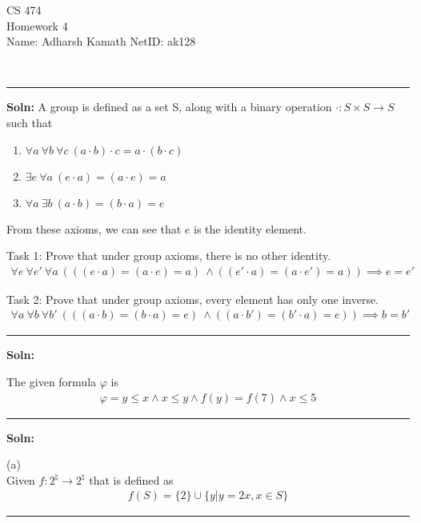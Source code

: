 \documentclass[12pt,letterpaper, onecolumn]{exam}
\begin{document}
\begingroup
\centering
\LARGE CS 474\\
\large Homework 4 \\[0.5em]
\endgroup
\begingroup
\normalsize \quad\quad\quad Name: Adharsh Kamath \quad\quad\quad \quad\quad\quad \quad\quad\quad \quad\quad\quad \quad  NetID: ak128 \par\
\endgroup
\rule{17cm}{0.4pt}
\pointsdroppedatright   %
\printanswers
\renewcommand{\solutiontitle}{\noindent\textbf{Soln:}\enspace}
\newcommand{\cheading}[1]{{\underline{\textit{#1}}}}

\renewcommand{\questionshook}{%
	\setlength{\leftmargin}{18pt}%
	\setlength{\labelwidth}{-\labelsep}%
}
\begin{questions}
	\question[]
	\solutiontitle
	A group is defined as a set S, along with a binary operation $ \cdot : S \times S \rightarrow S $ such that
	\begin{enumerate}
		\item $\forall a \: \forall  b \: \forall c \: (a \cdot b) \cdot c = a \cdot (b \cdot c)$
		\item $\exists e \: \forall a \: (e \cdot a) = (a \cdot e) = a$
		\item $\forall a \: \exists b \: (a \cdot b) = (b \cdot a) = e$
	\end{enumerate}

	From these axioms, we can see that $ e $ is the identity element.

	Task 1: Prove that under group axioms, there is no other identity.
	\begin{align*}
		\forall e \: \forall e' \: \forall a \: (((e \cdot a) = (a \cdot e) = a) \: \land ((e' \cdot a) = (a \cdot e') = a)) \implies e = e'
	\end{align*}

	Task 2: Prove that under group axioms, every element has only one inverse.
	\begin{align*}
		\forall a \: \forall b \: \forall b' \: (((a \cdot b) = (b \cdot a) = e) \: \land ((a \cdot b') = (b' \cdot a) = e)) \implies b = b'
	\end{align*}

	

    {\rule{17cm}{0.4pt}}

	\question[]
	\solutiontitle

	The given formula $ \varphi $ is
	\begin{align*}
		\varphi = y \le x \land x \le y \land f(y) = f(7) \land x \le 5
	\end{align*}


    {\rule{17cm}{0.4pt}}

	\question[]
	\solutiontitle

	(a) \\
	Given $ f: 2^{\natural} \rightarrow 2^{\natural} $ that is defined as 
	\begin{align*}
		f(S) = \{2\} \cup \{y | y = 2x, x \in S\}
	\end{align*}


    {\rule{17cm}{0.4pt}}

\end{questions}
\end{document}
